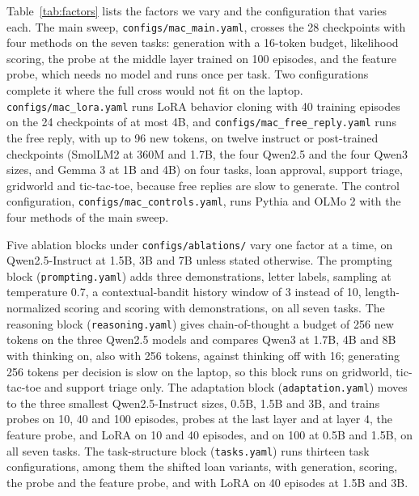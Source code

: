 Table~\ref{tab:factors} lists the factors we vary and the configuration that varies each. The main sweep, \texttt{configs/mac\_main.yaml}, crosses the 28 checkpoints with four methods on the seven tasks: generation with a 16-token budget, likelihood scoring, the probe at the middle layer trained on 100 episodes, and the feature probe, which needs no model and runs once per task. Two configurations complete it where the full cross would not fit on the laptop. \texttt{configs/mac\_lora.yaml} runs LoRA behavior cloning with 40 training episodes on the 24 checkpoints of at most 4B, and \texttt{configs/mac\_free\_reply.yaml} runs the free reply, with up to 96 new tokens, on twelve instruct or post-trained checkpoints (SmolLM2 at 360M and 1.7B, the four Qwen2.5 and the four Qwen3 sizes, and Gemma 3 at 1B and 4B) on four tasks, loan approval, support triage, gridworld and tic-tac-toe, because free replies are slow to generate. The control configuration, \texttt{configs/mac\_controls.yaml}, runs Pythia and OLMo 2 with the four methods of the main sweep.

Five ablation blocks under \texttt{configs/ablations/} vary one factor at a time, on Qwen2.5-Instruct at 1.5B, 3B and 7B unless stated otherwise. The prompting block (\texttt{prompting.yaml}) adds three demonstrations, letter labels, sampling at temperature 0.7, a contextual-bandit history window of 3 instead of 10, length-normalized scoring and scoring with demonstrations, on all seven tasks. The reasoning block (\texttt{reasoning.yaml}) gives chain-of-thought a budget of 256 new tokens on the three Qwen2.5 models and compares Qwen3 at 1.7B, 4B and 8B with thinking on, also with 256 tokens, against thinking off with 16; generating 256 tokens per decision is slow on the laptop, so this block runs on gridworld, tic-tac-toe and support triage only. The adaptation block (\texttt{adaptation.yaml}) moves to the three smallest Qwen2.5-Instruct sizes, 0.5B, 1.5B and 3B, and trains probes on 10, 40 and 100 episodes, probes at the last layer and at layer 4, the feature probe, and LoRA on 10 and 40 episodes, and on 100 at 0.5B and 1.5B, on all seven tasks. The task-structure block (\texttt{tasks.yaml}) runs thirteen task configurations, among them the shifted loan variants, with generation, scoring, the probe and the feature probe, and with LoRA on 40 episodes at 1.5B and 3B.

